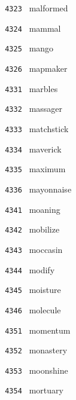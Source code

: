 \documentclass[11pt]{article}
\begin{document}
\begin{multicols}{6}
\noindent \texttt{ 4323 } \hspace{1mm} malformed  \par
\noindent \texttt{ 4324 } \hspace{1mm} mammal  \par
\noindent \texttt{ 4325 } \hspace{1mm} mango  \par
\noindent \texttt{ 4326 } \hspace{1mm} mapmaker  \par
\noindent \texttt{ 4331 } \hspace{1mm} marbles  \par
\noindent \texttt{ 4332 } \hspace{1mm} massager  \par
\noindent \texttt{ 4333 } \hspace{1mm} matchstick  \par
\noindent \texttt{ 4334 } \hspace{1mm} maverick  \par
\noindent \texttt{ 4335 } \hspace{1mm} maximum  \par
\noindent \texttt{ 4336 } \hspace{1mm} mayonnaise  \par
\noindent \texttt{ 4341 } \hspace{1mm} moaning  \par
\noindent \texttt{ 4342 } \hspace{1mm} mobilize  \par
\noindent \texttt{ 4343 } \hspace{1mm} moccasin  \par
\noindent \texttt{ 4344 } \hspace{1mm} modify  \par
\noindent \texttt{ 4345 } \hspace{1mm} moisture  \par
\noindent \texttt{ 4346 } \hspace{1mm} molecule  \par
\noindent \texttt{ 4351 } \hspace{1mm} momentum  \par
\noindent \texttt{ 4352 } \hspace{1mm} monastery  \par
\noindent \texttt{ 4353 } \hspace{1mm} moonshine  \par
\noindent \texttt{ 4354 } \hspace{1mm} mortuary  \par

\end{multicols}
\end{document}

